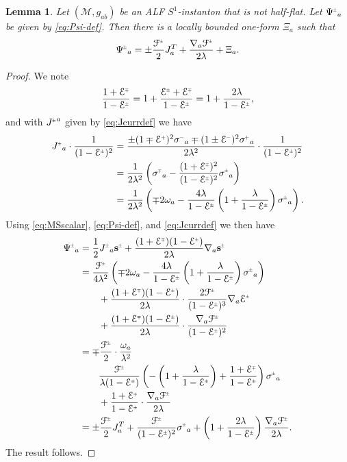 \documentclass[a4paper,11pt,reqno]{amsart}
\newcommand{\cM}{\mathcal{M}}
\theoremstyle{plain}
\newtheorem{lemma}[thm]{Lemma}
\renewcommand{\P}[1]{{{#1}^{\hspace{-.5pt}\scaleto{+}{4pt}}}}
\newcommand{\M}[1]{{{#1}^{\hspace{-.5pt}\scaleto{-}{4pt}}}}
\newcommand{\PM}[1]{{{#1}^{\hspace{-.5pt}\scaleto{\pm}{3.5pt}}}}
\newcommand{\MP}[1]{{{#1}^{\hspace{-.5pt}\scaleto{\mp}{3.5pt}}}}
\def\Fcal{\mathcal{F}}
\def\Ecal{\mathcal{E}}
\def\sbold{\mathbf{s}}
\numberwithin{equation}{section}
\begin{document}
\begin{lemma} \label{lem:rewrite} 
Let $(\cM, g_{ab})$ be an ALF $S^1$-instanton that is not half-flat. Let $\PM{\Psi}_a$ be given by \eqref{eq:Psi-def}. Then there is a locally bounded one-form $\Xi_a$ such that  
\begin{align}
\PM{\Psi}_a 
= \pm \frac{\PM{\Fcal}}{2} J^T_a 
+ \frac{\nabla_a\PM{\Fcal}}{2\lambda} + \Xi_a .
\end{align} 
\end{lemma} 
\begin{proof}
We note 
\begin{align}
\frac{1 + \MP{\Ecal}}{1 - \PM{\Ecal}}
= 1 + \frac{\PM{\Ecal} + \MP{\Ecal}}{1 - \PM{\Ecal}} 
= 1 + \frac{2\lambda}{1 - \PM{\Ecal}}, 
\end{align}
and with $\PM{J}^a$ given by \eqref{eq:Jcurrdef} we have
\begin{align}
\PM{J}_{a} \cdot \frac{1}{(1 - \PM{\Ecal})^2}
&= 
\frac{\pm(1 \mp \P{\Ecal})^2 \M{\sigma}_{a} \mp (1 \pm \M{\Ecal})^2 \P{\sigma}_{a}}{2 \lambda^2} 
\cdot \frac{1}{(1 - \PM{\Ecal})^2}  \\
&= 
\frac{1}{2 \lambda^2} \left(
\MP{\sigma}_{a} - \frac{(1 + \MP{\Ecal})^2}{(1 - \PM{\Ecal})^2} \PM{\sigma}_{a} 
\right)  \\
&=
\frac{1}{2 \lambda^2} \left(
\mp 2\omega_a - \frac{4\lambda}{1 - \PM{\Ecal}} 
\left( 1 + \frac{\lambda}{1 - \PM{\Ecal}} \right)  \PM{\sigma}_{a}
\right).
\end{align}
Using \eqref{eq:MSscalar}, \eqref{eq:Psi-def}, and \eqref{eq:Jcurrdef} we then have
\begin{align}
\PM{\Psi}_a
&= 
\frac{1}{2} \PM{J}_a \PM{\sbold}
+ \frac{(1 + \MP{\Ecal}) (1 -  \PM{\Ecal})}{2\lambda} \nabla_a \PM{\sbold} \\
&=
\frac{\PM{\Fcal}}{4 \lambda^2} \left(
\mp 2\omega_a 
- \frac{4\lambda}{1 - \PM{\Ecal}} \left( 1 + \frac{\lambda}{1 - \PM{\Ecal}} \right) \PM{\sigma}_{a}
\right) \\
&\qquad 
+ \frac{(1+\MP{\Ecal}) (1-\PM{\Ecal})}{2\lambda} \cdot \frac{2\PM{\Fcal}}{(1-\PM{\Ecal})^3} \nabla_a \PM{\Ecal} \\
&\qquad 
+ \frac{(1+\MP{\Ecal}) (1-\PM{\Ecal})}{2\lambda} \cdot \frac{\nabla_a \PM{\Fcal}}{(1 -  \PM{\Ecal})^2} \\
&= 
\mp\frac{\PM{\Fcal}}{2} \cdot \frac{\omega_a}{\lambda^2} \\
&\qquad
\frac{\PM{\Fcal}}{\lambda(1-\PM{\Ecal})} 
\left(
- \left( 1 + \frac{\lambda}{1 - \PM{\Ecal}} \right) 
+ \frac{1 + \MP{\Ecal}}{1-\PM{\Ecal}} 
\right) \PM{\sigma}_{a} \\
&\qquad 
+ \frac{1 + \MP{\Ecal}}{1 -  \PM{\Ecal}} \cdot \frac{\nabla_a\PM{\Fcal}}{2\lambda} \\
&= 
\pm\frac{\PM{\Fcal}}{2} J^T_a 
+ \frac{\PM{\Fcal}}{(1-\PM{\Ecal})^2} \PM{\sigma}_{a} 
+ \left( 1 + \frac{2\lambda}{1 - \PM{\Ecal}}\right) \frac{\nabla_a\PM{\Fcal}}{2\lambda}. 
\end{align}
The result follows. 
\end{proof} 
\end{document}
